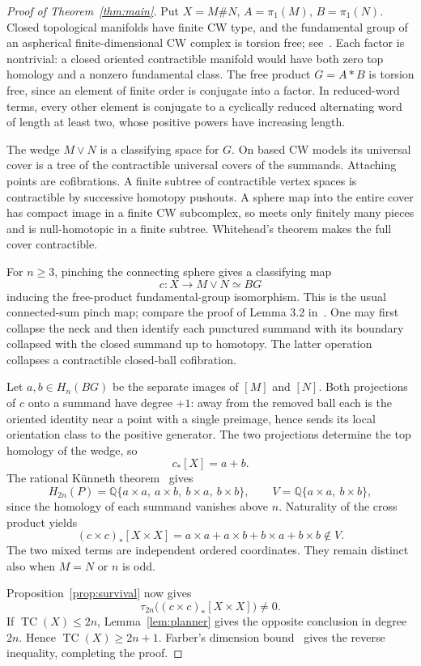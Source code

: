 \documentclass[11pt]{article}
\theoremstyle{remark}
\newcommand{\TC}{\operatorname{TC}}
\newcommand{\Q}{\mathbb{Q}}
\begin{document}
\begin{proof}[Proof of Theorem~\ref{thm:main}]
Put \(X=M\#N\), \(A=\pi_1(M)\), \(B=\pi_1(N)\).
Closed topological manifolds have finite CW type, and the fundamental
group of an aspherical finite-dimensional CW complex is torsion free;
see~\cite[Theorem 5.3 and Lemma 3.1]{Luck}. Each factor is nontrivial:
a closed oriented contractible manifold would have both zero top
homology and a nonzero fundamental class. The free product \(G=A*B\)
is torsion free, since an element of finite order is conjugate into
a factor. In reduced-word terms, every other element is conjugate
to a cyclically reduced alternating word of length at least two,
whose positive powers have increasing length.

The wedge \(M\vee N\) is a classifying space for \(G\).
On based CW models its universal cover is a tree of the contractible
universal covers of the summands. Attaching points are cofibrations.
A finite subtree of contractible vertex spaces is contractible by
successive homotopy pushouts. A sphere map into the entire cover
has compact image in a finite CW subcomplex, so meets only finitely
many pieces and is null-homotopic in a finite subtree. Whitehead's
theorem makes the full cover contractible.

For \(n\geq3\), pinching the connecting sphere gives a classifying
map
\[
 c:X\longrightarrow M\vee N\simeq BG
\]
inducing the free-product fundamental-group isomorphism.
This is the usual connected-sum pinch map; compare the proof of
Lemma 3.2 in~\cite{Luck}. One may first collapse the neck and then
identify each punctured summand with its boundary collapsed with
the closed summand up to homotopy. The latter operation collapses
a contractible closed-ball cofibration.

Let \(a,b\in H_n(BG)\) be the separate images of \([M]\) and \([N]\).
Both projections of \(c\) onto a summand have degree \(+1\):
away from the removed ball each is the oriented identity near a
point with a single preimage, hence sends its local orientation
class to the positive generator. The two projections determine
the top homology of the wedge, so
\[
 c_*[X]=a+b.
\]
The rational K\"unneth theorem~\cite[Chapter 17, Section 2]{May} gives
\[
 H_{2n}(P)
   =\Q\{a\times a,\ a\times b,\ b\times a,\ b\times b\},
 \qquad V=\Q\{a\times a,\ b\times b\},
\]
since the homology of each summand vanishes above \(n\).
Naturality of the cross product yields
\[
 (c\times c)_*[X\times X]
   =a\times a+a\times b+b\times a+b\times b\notin V.
\]
The two mixed terms are independent ordered coordinates. They
remain distinct also when \(M=N\) or \(n\) is odd.

Proposition~\ref{prop:survival} now gives
\[
 \tau_{2n}\big((c\times c)_*[X\times X]\big)\neq0.
\]
If \(\TC(X)\leq2n\), Lemma~\ref{lem:planner} gives the opposite
conclusion in degree \(2n\). Hence \(\TC(X)\geq2n+1\).
Farber's dimension bound~\cite[Theorem 4]{Farber} gives the reverse
inequality, completing the proof.
\end{proof}
\end{document}

